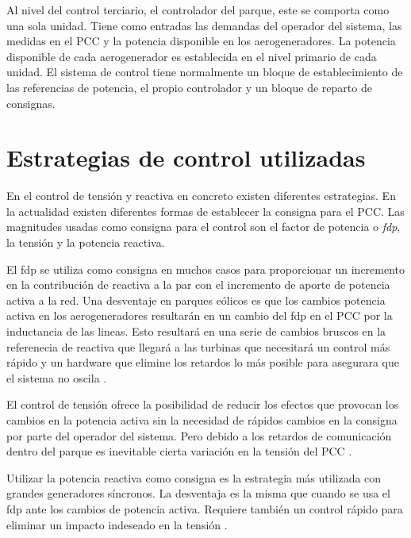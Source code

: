 \documentclass{book}
\begin{document}
Al nivel del control terciario, el controlador del parque, este se comporta como una sola unidad. Tiene como entradas las demandas del operador del sistema, las medidas en el PCC y la potencia disponible en los aerogeneradores. La potencia disponible de cada aerogenerador es establecida en el nivel primario de cada unidad. El sistema de control tiene normalmente un bloque de establecimiento de las referencias de potencia, el propio controlador y un bloque de reparto de consignas\cite{DankControl}. \par


	\section{Estrategias de control utilizadas}


En el control de tensi\'on y reactiva en concreto existen diferentes estrategias. En la actualidad existen diferentes formas de establecer la consigna para el PCC. Las magnitudes usadas como consigna para el control son el factor de potencia o \emph{fdp}, la tensi\'on y la potencia reactiva. \par

El fdp se utiliza como consigna en muchos casos para proporcionar un incremento en la contribuci\'on de reactiva a la par con el incremento de aporte de potencia activa a la red. Una desventaje en parques e\'olicos es que los cambios potencia activa en los aerogeneradores resultar\'an en un cambio del fdp en el PCC por la inductancia de las lineas. Esto resultar\'a en una serie de cambios bruscos en la referenecia de reactiva que llegar\'a a las turbinas que necesitar\'a un control m\'as r\'apido y un hardware que elimine los retardos lo m\'as posible para asegurara que el sistema no oscila \cite{SPControl}.

El control de tensi\'on ofrece la posibilidad de reducir los efectos que provocan los cambios en la potencia activa sin la necesidad de r\'apidos cambios en la consigna por parte del operador del sistema. Pero debido a los retardos de comunicaci\'on dentro del parque es inevitable cierta variaci\'on en la tensi\'on del PCC \cite{SPControl}. \par

Utilizar la potencia reactiva como consigna es la estrategia m\'as utilizada  con grandes generadores s\'incronos. La desventaja es la misma que cuando se usa el fdp ante los cambios de potencia activa. Requiere tambi\'en un control r\'apido para eliminar un impacto indeseado en la tensi\'on \cite{SPControl}. \par
\end{document}
